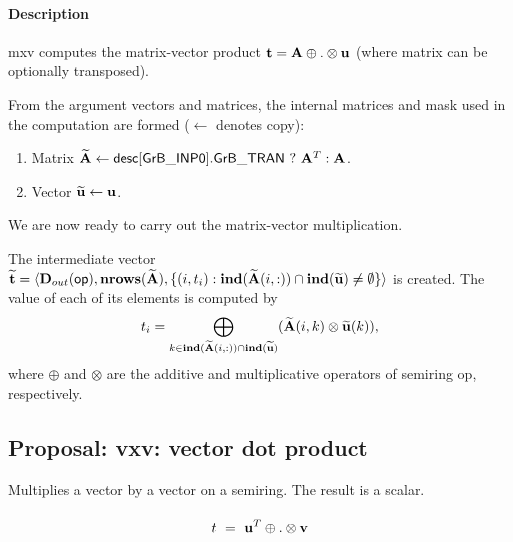 \paragraph{Description}

{\sf mxv} computes the matrix-vector product ${\bf t} = {\bf A}
\oplus . \otimes {\bf u}$ (where matrix 
 can be optionally transposed).



From the argument vectors and matrices, the internal matrices and mask used in 
the computation are formed ($\leftarrow$ denotes copy):  
\begin{enumerate}
	\item Matrix ${\bf \widetilde{A}} \leftarrow {\sf desc[GrB\_INP0].GrB\_TRAN} \ ? \ {\bf A}^T : {\bf A}$.

	\item Vector ${\bf \widetilde{u}} \leftarrow {\bf u}$.
\end{enumerate}


We are now ready to carry out the matrix-vector multiplication.

The intermediate vector ${\bf \widetilde{t}} = \langle
\mbox{$\mathbf{D}_{out}$}({\sf op}), \bold{nrows}({\bf \widetilde{A}}),
\{(i,t_i) : \bold{ind}({\bf \widetilde{A}}(i,:)) \cap 
\bold{ind}({\bf \widetilde{u}}) \neq \emptyset \} \rangle$
is created.  The value of each of its elements is computed by 
\[t_i = \bigoplus_{k \in \bold{ind}({\bf \widetilde{A}}(i,:)) \cap
\bold{ind}({\bf \widetilde{u}})} ({\bf \widetilde{A}}(i,k)
\otimes {\bf \widetilde{u}}(k)),\] where $\oplus$ and $\otimes$
are the additive and multiplicative operators of semiring {\sf op},
respectively.



\subsection{Proposal: {\sf vxv}: vector dot product}

Multiplies a vector by a vector on a semiring. The result is a scalar.

\paragraph{\syntax}

$$
t ~ = ~ {\bf u}^T \oplus.\otimes {\bf v}
$$
